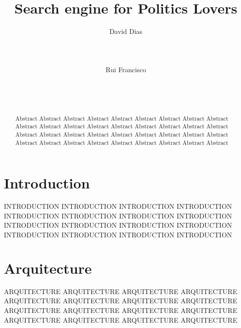 \documentclass{acm_proc_article-sp}
\begin{document}
\title{Search engine for {\ttlit Politics} Lovers}

\author{
\alignauthor
David Dias\\
       \\
       \\
       \\
\alignauthor
Rui Francisco\\
       \\
       \\
       \\
}
\maketitle
\begin{abstract}
Abstract Abstract Abstract Abstract Abstract Abstract Abstract Abstract Abstract Abstract Abstract Abstract Abstract Abstract Abstract Abstract Abstract Abstract Abstract Abstract Abstract Abstract Abstract Abstract Abstract Abstract Abstract Abstract Abstract Abstract Abstract Abstract Abstract Abstract Abstract Abstract 

\end{abstract}



\section{Introduction}
INTRODUCTION INTRODUCTION INTRODUCTION INTRODUCTION INTRODUCTION INTRODUCTION INTRODUCTION INTRODUCTION INTRODUCTION INTRODUCTION INTRODUCTION INTRODUCTION INTRODUCTION INTRODUCTION INTRODUCTION INTRODUCTION 


\section{Arquitecture}
ARQUITECTURE ARQUITECTURE ARQUITECTURE ARQUITECTURE ARQUITECTURE ARQUITECTURE ARQUITECTURE ARQUITECTURE ARQUITECTURE ARQUITECTURE ARQUITECTURE ARQUITECTURE ARQUITECTURE ARQUITECTURE ARQUITECTURE ARQUITECTURE 
\end{document}
